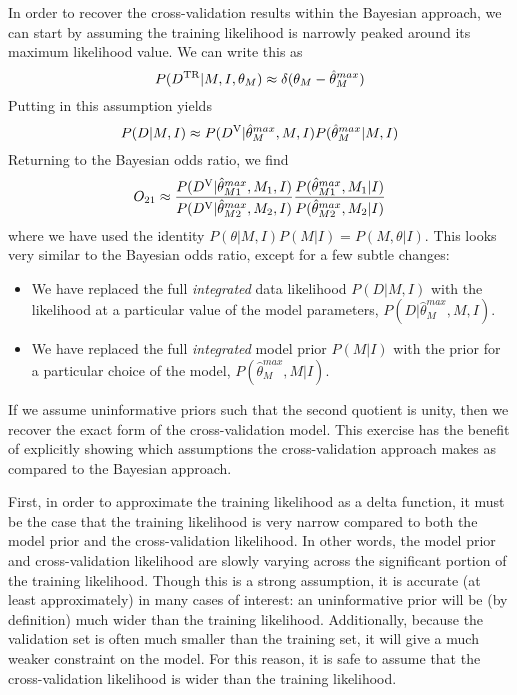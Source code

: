 \documentclass[12pt]{article}
\newcommand{\Dtr}{\ensuremath{D^{\rm TR}}}
\newcommand{\Dva}{\ensuremath{D^{\rm V}}}
\begin{document}
In order to recover the cross-validation results within the Bayesian approach,
we can start by assuming the training likelihood is narrowly peaked around its
maximum likelihood value.  We can write this as
\begin{equation}
  P(\Dtr|M, I, \theta_M) \approx \delta(\theta_M - \hat{\theta}^{max}_M)
\end{equation}
Putting in this assumption yields
\begin{equation}
  P(D|M,I) \approx P(\Dva|\hat{\theta}^{max}_M,M,I)P(\hat{\theta}^{max}_M|M,I)
\end{equation}
Returning to the Bayesian odds ratio, we find
\begin{equation}
  O_{21} \approx \frac{P(\Dva|\hat{\theta}^{max}_{M1},M_1,I)}
                     {P(\Dva|\hat{\theta}^{max}_{M2},M_2,I)}
                \frac{P(\hat{\theta}^{max}_{M1},M_1|I)}
                     {P(\hat{\theta}^{max}_{M2},M_2|I)}
\end{equation}
where we have used the identity $P(\theta|M,I)P(M|I) = P(M,\theta|I)$.
This looks very similar to the Bayesian odds ratio, except for a few
subtle changes:
\begin{itemize}
  \item We have replaced the full {\it integrated} data likelihood
    $P(D|M,I)$ with the likelihood at a particular value of the model
    parameters, $P(D|\hat{\theta}^{max}_{M},M,I)$.
  \item We have replaced the full {\it integrated} model prior $P(M|I)$
    with the prior for a particular choice of the model,
    $P(\hat{\theta}^{max}_{M},M|I)$.
\end{itemize}
If we assume uninformative priors such that the second quotient is unity,
then we recover the exact form of the cross-validation model.
This exercise has the benefit of explicitly showing which assumptions the
cross-validation approach makes as compared to the Bayesian approach.

First, in order to approximate the training likelihood as a delta function,
it must be the case that the training likelihood is very narrow compared to
both the model prior and the cross-validation likelihood.  In other words,
the model prior and cross-validation likelihood are slowly varying across
the significant portion of the training likelihood.  Though this is a strong
assumption, it is accurate (at least approximately) in many cases of interest:
an uninformative prior will be (by definition) much wider than the training
likelihood.  Additionally, because the validation set is often much
smaller than the training set, it will give a much weaker constraint on the
model.  For this reason, it is safe to assume that the cross-validation
likelihood is wider than the training likelihood.
\end{document}
